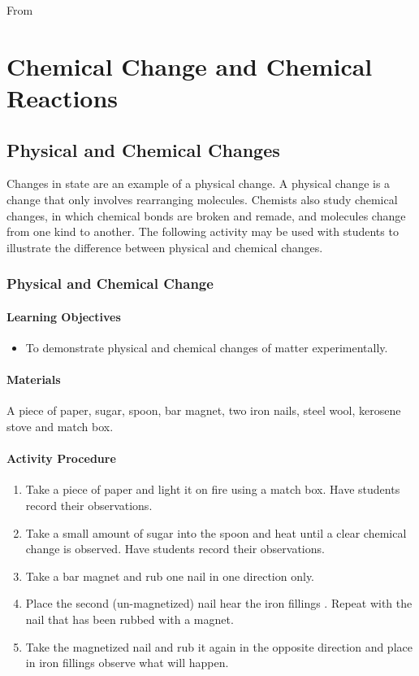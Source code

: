 From \chapter{Chemical Change and Chemical Reactions}


\section{Physical and Chemical Changes}

Changes in state are an example of a physical change. A physical change is a change that only involves rearranging molecules. Chemists also study chemical changes, in which chemical bonds are broken and remade, and molecules change from one kind to another. The following activity may be used with students to illustrate the difference between physical and chemical changes.

\subsection{Physical and Chemical Change}

\subsubsection*{Learning Objectives}
\begin{itemize}
\item{To demonstrate physical and chemical changes of matter experimentally.}
\end{itemize}


\subsubsection*{Materials}
A piece of paper, sugar, spoon, bar magnet, two iron nails, steel wool, kerosene stove and match box.

\subsubsection*{Activity Procedure}
\begin{enumerate}
\item{Take a piece of paper and light it on fire using a match box. Have students record their observations.}
\item{Take a small amount of sugar into the spoon and heat until a clear chemical change is observed. Have students record their observations.}
\item{Take a bar magnet and rub one nail in one direction only.}
\item{ Place the second (un-magnetized) nail hear the iron fillings . Repeat with the nail that has been rubbed with a magnet.}
\item{Take the magnetized nail and rub it again in the opposite direction and place in iron fillings observe what will happen.}
\end{enumerate}

